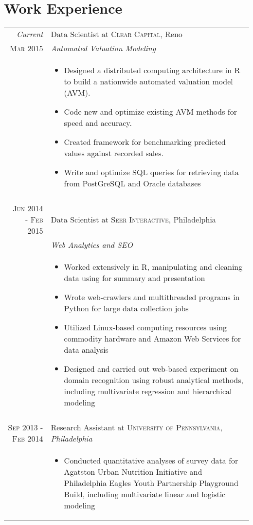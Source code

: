 \documentclass[a4paper,10pt]{article}
\begin{document}
\section{Work Experience}
\begin{tabular}{r|p{11cm}}
 \emph{Current} & Data Scientist at \textsc{Clear Capital}, Reno \\\textsc{Mar 2015}&\emph{Automated Valuation Modeling}\\&\footnotesize{\begin{itemize}
 		\item{Designed a distributed computing architecture in R to build a nationwide automated valuation model (AVM).}
 		\item{Code new and optimize existing AVM methods for speed and accuracy.}
 		\item{Created framework for benchmarking predicted values against recorded sales.}
 		\item{Write and optimize SQL queries for retrieving data from PostGreSQL and Oracle databases}
 	\end{itemize}}\\\multicolumn{2}{c}{} \\ 	
 \textsc{Jun 2014 - Feb 2015} & Data Scientist at \textsc{Seer Interactive}, Philadelphia \\&\emph{Web Analytics and SEO}\\&\footnotesize{\begin{itemize}
 		\item{Worked extensively in R, manipulating and cleaning data using for summary and presentation}
 		\item{Wrote web-crawlers and multithreaded programs in Python for large data collection jobs}
 		\item{Utilized Linux-based computing resources using commodity hardware and Amazon Web Services for data analysis}
 		\item{Designed and carried out web-based experiment on domain recognition using robust analytical methods, including multivariate regression and hierarchical modeling}
 	\end{itemize}}\\\multicolumn{2}{c}{} \\	
 \textsc{Sep 2013 - Feb 2014} & Research Assistant at \textsc{University of Pennsylvania}, \emph{Philadelphia}\\&\footnotesize{\begin{itemize}
 		\item{Conducted quantitative analyses of survey data for Agatston Urban Nutrition Initiative and Philadelphia Eagles Youth Partnership Playground Build, including multivariate linear and logistic modeling}

\end{itemize}}
\end{tabular}
\end{document}
